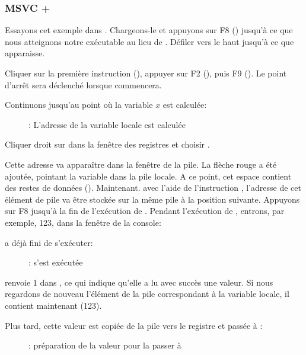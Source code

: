 \clearpage
\subsubsection{MSVC + \olly}
\myindex{\olly}

Essayons cet exemple dans \olly.
Chargeons-le et appuyons sur F8 (\stepover) jusqu'à ce que nous atteignons notre
exécutable au lieu de .
Défiler vers le haut jusqu'à ce que \main apparaisse.

Cliquer sur la première instruction  (), appuyer sur F2 (), puis F9 ().
Le point d'arrêt sera déclenché lorsque \main commencera.

Continuons jusqu'au point où la variable $x$ est calculée:

\begin{figure}[H]
\centering
{}
\caption{\olly: L'adresse de la variable locale est calculée}
\label{fig:scanf_ex1_olly_1}
\end{figure}

Cliquer droit sur \EAX dans la fenêtre des registres et choisir .

Cette adresse va apparaître dans la fenêtre de la pile.
La flèche rouge a été ajoutée, pointant la variable dans la pile locale.
A ce point, cet espace contient des restes de données ().
Maintenant. avec l'aide de l'instruction \PUSH, l'adresse de cet élément de pile
va être stockée sur la même pile à la position suivante.
Appuyons sur F8 jusqu'à la fin de l'exécution de \scanf.
Pendant l'exécution de \scanf, entrons, par exemple, 123, dans la fenêtre de la console:



\clearpage
\scanf a déjà fini de s'exécuter:

\begin{figure}[H]
\centering
{}
\caption{\olly: \scanf s'est exécutée}
\label{fig:scanf_ex1_olly_3}
\end{figure}

\scanf renvoie 1 dans \EAX, ce qui indique qu'elle a lu avec succès une valeur.
Si nous regardons de nouveau l'élément de la pile correspondant à la variable
locale, il contient maintenant  (123).

\clearpage

Plus tard, cette valeur est copiée de la pile vers le registre \ECX et passée à \printf:

\begin{figure}[H]
\centering
{}
\caption{\olly: préparation de la valeur pour la passer à \printf}
\label{fig:scanf_ex1_olly_4}
\end{figure}
